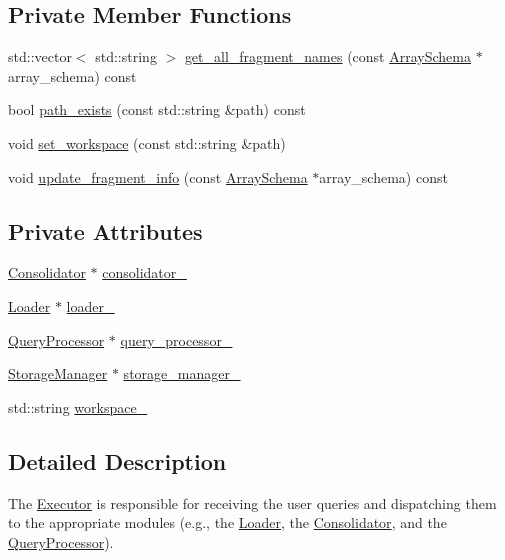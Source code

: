 \subsection*{Private Member Functions}
\begin{DoxyCompactItemize}
\item 
std\+::vector$<$ std\+::string $>$ \hyperlink{classExecutor_ace6488bc7140a974f82232c50469d590}{get\+\_\+all\+\_\+fragment\+\_\+names} (const \hyperlink{classArraySchema}{Array\+Schema} $\ast$array\+\_\+schema) const 
\item 
bool \hyperlink{classExecutor_a0af6b19b60d913bdb5eb2038640a0004}{path\+\_\+exists} (const std\+::string \&path) const 
\item 
void \hyperlink{classExecutor_a3a3e2b0b4be9e268745001efc43ffbd4}{set\+\_\+workspace} (const std\+::string \&path)
\item 
void \hyperlink{classExecutor_a47f3c192d8031a94b256829aaf09b867}{update\+\_\+fragment\+\_\+info} (const \hyperlink{classArraySchema}{Array\+Schema} $\ast$array\+\_\+schema) const 
\end{DoxyCompactItemize}
\subsection*{Private Attributes}
\begin{DoxyCompactItemize}
\item 
\hyperlink{classConsolidator}{Consolidator} $\ast$ \hyperlink{classExecutor_aa9659d47bccbe09cdd01357712bca7e2}{consolidator\+\_\+}
\item 
\hyperlink{classLoader}{Loader} $\ast$ \hyperlink{classExecutor_a4939f1b29639e263d50da6436c24bff6}{loader\+\_\+}
\item 
\hyperlink{classQueryProcessor}{Query\+Processor} $\ast$ \hyperlink{classExecutor_a83f7004773177d4dd47ca0a3f32d4f89}{query\+\_\+processor\+\_\+}
\item 
\hyperlink{classStorageManager}{Storage\+Manager} $\ast$ \hyperlink{classExecutor_ae8cbe36555c96a8d5efde76a542acd92}{storage\+\_\+manager\+\_\+}
\item 
std\+::string \hyperlink{classExecutor_a6acb7687ad0865b90cb77f3290482d8b}{workspace\+\_\+}
\end{DoxyCompactItemize}


\subsection{Detailed Description}
The \hyperlink{classExecutor}{Executor} is responsible for receiving the user queries and dispatching them to the appropriate modules (e.\+g., the \hyperlink{classLoader}{Loader}, the \hyperlink{classConsolidator}{Consolidator}, and the \hyperlink{classQueryProcessor}{Query\+Processor}). 

